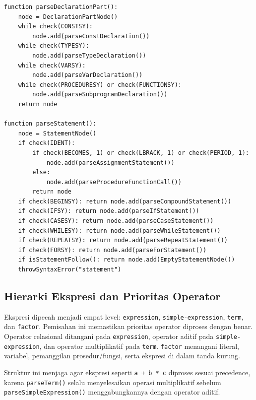\begin{tcolorbox}[title=Pseudocode struktur non-terminal,colback=gray!5,colframe=black!60,boxrule=0.5pt,arc=2mm,breakable]
\begin{verbatim}
function parseDeclarationPart():
    node = DeclarationPartNode()
    while check(CONSTSY):
        node.add(parseConstDeclaration())
    while check(TYPESY):
        node.add(parseTypeDeclaration())
    while check(VARSY):
        node.add(parseVarDeclaration())
    while check(PROCEDURESY) or check(FUNCTIONSY):
        node.add(parseSubprogramDeclaration())
    return node

function parseStatement():
    node = StatementNode()
    if check(IDENT):
        if check(BECOMES, 1) or check(LBRACK, 1) or check(PERIOD, 1):
            node.add(parseAssignmentStatement())
        else:
            node.add(parseProcedureFunctionCall())
        return node
    if check(BEGINSY): return node.add(parseCompoundStatement())
    if check(IFSY): return node.add(parseIfStatement())
    if check(CASESY): return node.add(parseCaseStatement())
    if check(WHILESY): return node.add(parseWhileStatement())
    if check(REPEATSY): return node.add(parseRepeatStatement())
    if check(FORSY): return node.add(parseForStatement())
    if isStatementFollow(): return node.add(EmptyStatementNode())
    throwSyntaxError("statement")
\end{verbatim}
\end{tcolorbox}

\subsection{Hierarki Ekspresi dan Prioritas Operator}
Ekspresi dipecah menjadi empat level: 
\texttt{expression}, 
\texttt{simple-expression}, \texttt{term}, dan \texttt{factor}. 
Pemisahan ini memastikan prioritas operator diproses dengan benar. 
Operator relasional ditangani pada \texttt{expression}, operator 
aditif pada \texttt{simple-expression}, dan operator multiplikatif 
pada \texttt{term}. \texttt{factor} menangani literal, variabel, pemanggilan 
prosedur/fungsi, serta ekspresi di dalam tanda kurung.

Struktur ini menjaga agar ekspresi seperti \texttt{a + b * c} diproses sesuai precedence, karena \texttt{parseTerm()} selalu menyelesaikan operasi multiplikatif sebelum \texttt{parseSimpleExpression()} menggabungkannya dengan operator aditif.

